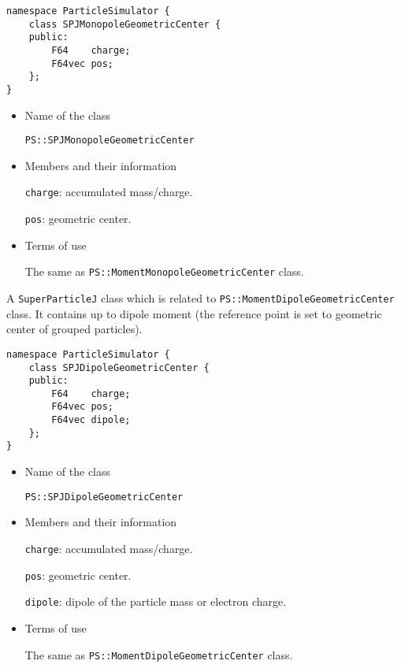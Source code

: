 \begin{screen}
\begin{verbatim}
namespace ParticleSimulator {
    class SPJMonopoleGeometricCenter {
    public:
        F64    charge;    
        F64vec pos;
    };
}
\end{verbatim}
\end{screen}

\begin{itemize}

\item Name of the class

  \texttt{PS::SPJMonopoleGeometricCenter}

\item Members and their information

  \texttt{charge}: accumulated mass/charge.

  \texttt{pos}: geometric center.

\item Terms of use

  The same as \texttt{PS::MomentMonopoleGeometricCenter} class.

\end{itemize}

\label{sec:SPJDipoleGeometricCenter}

A \texttt{SuperParticleJ} class which is related to \texttt{PS::MomentDipoleGeometricCenter} class. It contains up to dipole moment (the reference point is set to geometric center of grouped particles).

\begin{screen}
\begin{verbatim}
namespace ParticleSimulator {
    class SPJDipoleGeometricCenter {
    public:
        F64    charge;    
        F64vec pos;
        F64vec dipole;
    };
}
\end{verbatim}
\end{screen}

\begin{itemize}

\item Name of the class

  \texttt{PS::SPJDipoleGeometricCenter}


\item Members and their information

  \texttt{charge}: accumulated mass/charge.

  \texttt{pos}: geometric center.

  \texttt{dipole}: dipole of the particle mass or electron charge.

\item Terms of use

  The same as \texttt{PS::MomentDipoleGeometricCenter} class.

\end{itemize}

